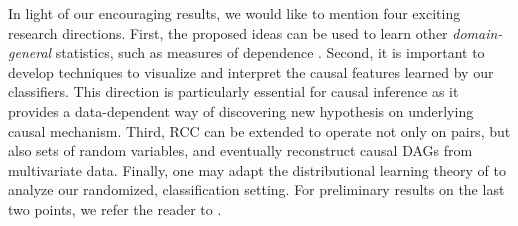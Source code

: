 \documentclass[twoside,11pt,a4paper]{article}
\begin{document}
In light of our encouraging results, we would like to mention four exciting 
research directions.  First, the proposed ideas can be used to learn other 
\emph{domain-general} statistics, such as
measures of dependence \citep{Lopez-Paz13}. Second, it is important to develop 
techniques to visualize and interpret the causal features learned by our
classifiers. This direction is particularly essential 
for causal inference as it provides a data-dependent way of discovering new 
hypothesis on underlying 
causal mechanism. Third, RCC can be extended to operate not only on pairs, 
but also sets of random variables, and eventually reconstruct causal DAGs from multivariate
data. Finally, one may adapt the distributional learning theory of
\citet{Szabo14} to analyze our randomized, classification setting. For
preliminary results on the last two points, we refer the reader to
\citep{Lopez-Paz15}.


{\small
\newpage

}
\end{document}
